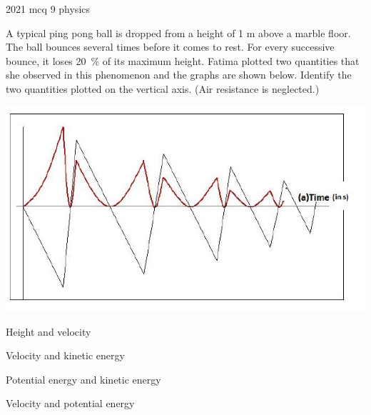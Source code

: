 \ylDisplay
{}%
{2021}%
{mcq}%
{9}%
{physics}%
{}%
{
\ifStatement
A typical ping pong ball is dropped from a height of 1 m above a marble floor. The ball bounces several times before it comes to rest. For every successive bounce, it loses \SI{20}{\percent} of its maximum height. Fatima plotted two quantities that she observed in this phenomenon and the graphs are shown below. Identify the two quantities plotted on the vertical axis. (Air resistance is neglected.)
\begin{center}
  \includegraphics[width=0.7\linewidth]{2021-mcq-09-p}
\end{center}
\fi


Height and velocity
\fi


Velocity and kinetic energy
\fi


Potential energy and kinetic energy
\fi


Velocity and potential energy
\fi


\ifHint

\fi


\ifSolution

\fi


\ifEstStatement

\fi



\fi



\fi



\fi



\fi


\ifEstHint

\fi


\ifEstSolution

\fi
}
